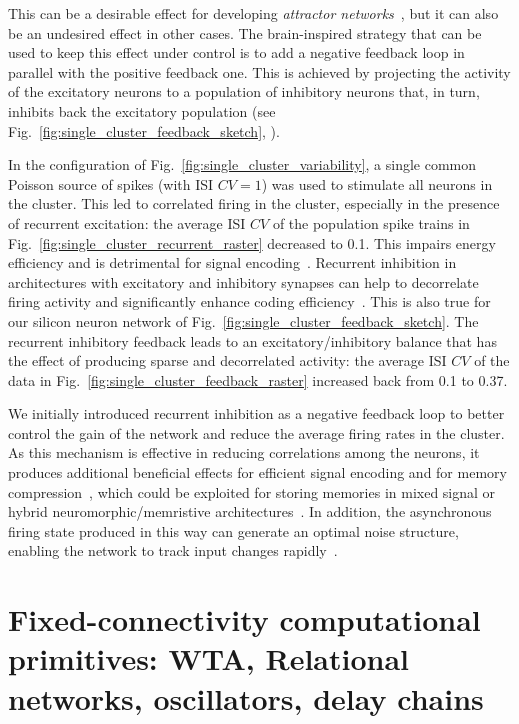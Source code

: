 This can be a desirable effect for developing \emph{attractor networks}~\cite{Amit_etal85,Amit92}, but it can also be an undesired effect in other cases.
The brain-inspired strategy that can be used to keep this effect under control is to add a negative feedback loop in parallel with the positive feedback one.
This is achieved by projecting the activity of the excitatory neurons to a population of inhibitory neurons that, in turn, inhibits back the excitatory population (see Fig.~\ref{fig:single_cluster_feedback_sketch}, ).


In the configuration of Fig.~\ref{fig:single_cluster_variability}, a single common Poisson source of spikes (with ISI $CV=1$) was used to stimulate all neurons in the cluster.
This led to correlated firing in the cluster, especially in the presence of recurrent excitation: the average ISI $CV$ of the population spike trains in Fig.~\ref{fig:single_cluster_recurrent_raster} decreased to 0.1. This impairs energy efficiency and is detrimental for signal encoding~\cite{Shadlen_Newsome98,Shamir_Sompolinsky06}.
Recurrent inhibition in architectures with excitatory and inhibitory synapses can help to decorrelate firing activity and significantly enhance coding efficiency~\cite{Tetzlaff_etal12,Zeldenrust_etal21,Koren_Panzeri22}.
This is also true for our silicon neuron network of Fig.~\ref{fig:single_cluster_feedback_sketch}. The recurrent inhibitory feedback leads to an excitatory/inhibitory balance that has the effect of producing sparse and decorrelated activity: the average ISI $CV$ of the data in Fig.~\ref{fig:single_cluster_feedback_raster} increased back from 0.1 to 0.37.

We initially introduced recurrent inhibition as a negative feedback loop to better control the gain of the network and reduce the average firing rates in the cluster.
As this mechanism is effective in reducing correlations among the neurons, it produces additional beneficial effects for efficient signal encoding and for memory compression~\cite{Boerlin_etal13,Benna_Fusi21}, which could be exploited for storing memories in mixed signal or hybrid neuromorphic/memristive architectures~\cite{Brivio_etal19,Giotis_etal22}.
In addition, the asynchronous firing state produced in this way can generate an optimal noise structure, enabling the network to track input changes rapidly~\cite{Tian_etal20,Timcheck_etal22}.




\section{Fixed-connectivity computational primitives: WTA, Relational networks, oscillators, delay chains}

